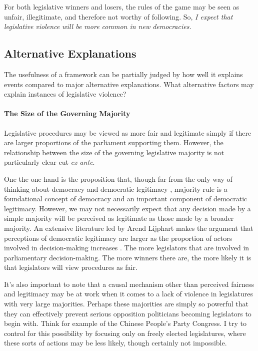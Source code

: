 \documentclass[a4paper]{article}\usepackage{graphicx, color}
\begin{document}
For both legislative winners and losers, the rules of the game may be seen as unfair, illegitimate, and therefore not worthy of following. So, \emph{I expect that legislative violence will be more common in new democracies.}


\subsection{Alternative Explanations}

The usefulness of a framework can be partially judged by how well it explains events compared to major alternative explanations. What alternative factors may explain instances of legislative violence?

\paragraph{The Size of the Governing Majority}

Legislative procedures may be viewed as more fair and legitimate simply if there are larger proportions of the parliament supporting them. However, the relationship between the size of the governing legislative majority is not particularly clear cut \emph{ex ante}. 

One the one hand is the proposition that, though far from the only way of thinking about democracy and democratic legitimacy \cite[see][for a discussion]{Follesdal2006}, majority rule is a foundational concept of democracy \cite{Dahl1989} and an important component of democratic legitimacy. However, we may not necessarily expect that any decision made by a simple majority will be perceived as legitimate as those made by a broader majority. An extensive literature led by Arend Lijphart makes the argument that perceptions of democratic legitimacy are larger as the proportion of actors involved in decision-making increases \citep{Lijphart2007}. The more legislators that are involved in parliamentary decision-making. The more winners there are, the more likely it is that legislators will view procedures as fair. 

It's also important to note that a causal mechanism other than perceived fairness and legitimacy may be at work when it comes to a lack of violence in legislatures with very large majorities. Perhaps these majorities are simply so powerful that they can effectively prevent serious opposition politicians becoming legislators to begin with. Think for example of the Chinese People's Party Congress. I try to control for this possibility by focusing only on freely elected legislatures, where these sorts of actions may be less likely, though certainly not impossible. 
\end{document}
